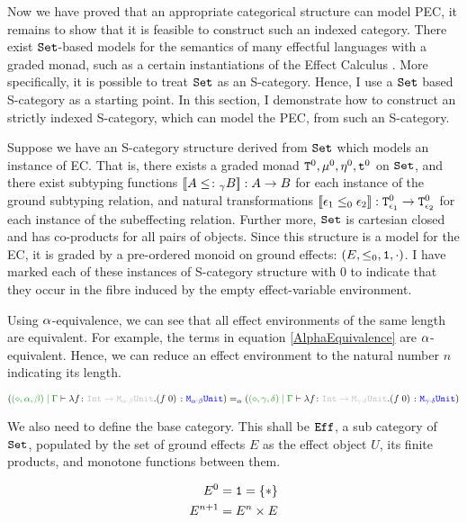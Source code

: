 \documentclass{Report}
\begin{document}
Now we have proved that an appropriate categorical structure can model PEC, it remains to show that it is feasible to construct such an indexed category. There exist $\texttt{Set}$-based models for the semantics of many effectful languages with a graded monad, such as a certain instantiations of the Effect Calculus \cite{Katsumata:2014}. More specifically, it is possible to treat $\texttt{Set}$ as an S-category. Hence, I use a $\texttt{Set}$ based S-category as a starting point. In this section, I  demonstrate how to construct an strictly indexed S-category, which can model the PEC, from such an S-category.

Suppose we have an S-category structure derived from $\texttt{Set}$ which models an instance of EC. That is, there exists a graded monad $\texttt{T}^0_{}, \mu^0, \eta_{}^0, \texttt{t}^0$ on $\texttt{Set}$, and there exist subtyping functions ${\bf [\![}A\leq\colon_\gamma B{\bf ]\!]}: A \rightarrow B$ for each instance of the ground subtyping relation, and natural transformations ${\bf [\![}\epsilon_1 \leq_0 \epsilon_2{\bf ]\!]}: \texttt{T}^0_{\epsilon_1} \rightarrow \texttt{T}^0_{\epsilon_2}$ for each instance of the subeffecting relation. Further more, $\texttt{Set}$ is cartesian closed and has co-products for all pairs of objects. Since this structure is a model for the EC, it is graded by a pre-ordered monoid on ground effects: $(E, \leq_0, \texttt{1}, \cdot)$. I have marked each of these instances of S-category structure with $0$ to indicate that they occur in the fibre induced by the empty effect-variable environment.

Using $\alpha$-equivalence, we can see that all effect environments of the same length are equivalent. For example, the terms in equation \ref{AlphaEquivalence} are $\alpha$-equivalent. Hence, we can reduce an effect environment to the natural number $n$ indicating its length.

\begin{equation}\label{AlphaEquivalence}
    \scalebox{.8}{$
    (\etyperelation{(\nil, \a, \b)}{\G}{\lam{f}{\fntype{\texttt{Int}}{\M{\a\dot\b}{\U}}}{(\apply{f}{0})}}{\M{\a\dot\b}{\U}})  =_\a(\etyperelation{(\nil, \g, \d)}{\G}{\lam{f}{\fntype{\texttt{Int}}{\M{\g\dot\d}{\U}}}{(\apply{f}{0})}}{\M{\g\dot\d}{\U}})
    $}
\end{equation}


We also need to define the base category. This shall be $\texttt{Eff}$, a sub category of $\texttt{Set}$, populated by the set of ground effects $E$ as the effect object $U$, its finite products, and monotone functions between them.

\begin{align*}
    E^0 & = \texttt{1} = \left\{\ast\right\}\\
    E^{n+1} &= E^n \times E
\end{align*}
\end{document}
